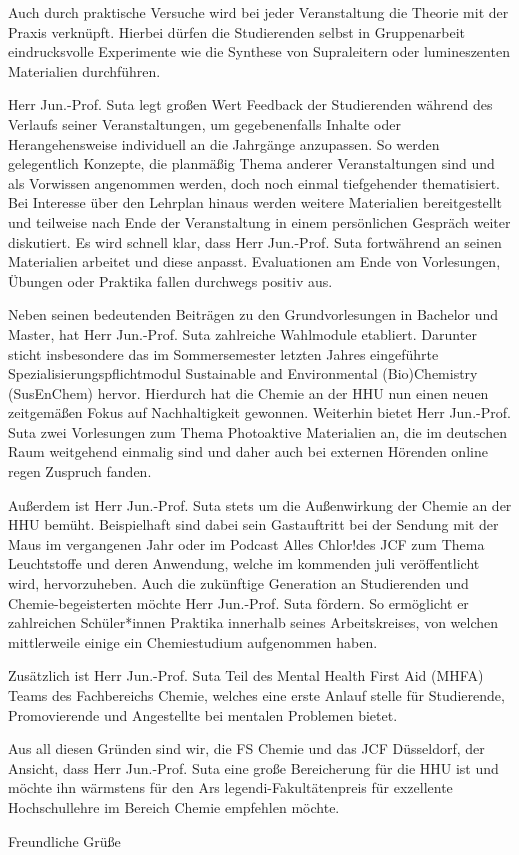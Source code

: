 \documentclass[foldmarks,rightdate,twoside,a4paper]{hhuletter}
\begin{document}
\begin{letter}
Auch durch praktische Versuche wird bei jeder Veranstaltung die Theorie mit der Praxis verknüpft. Hierbei dürfen die Studierenden selbst in Gruppenarbeit eindrucksvolle Experimente wie die Synthese von Supraleitern oder lumineszenten Materialien durchführen.

Herr Jun.-Prof. Suta legt großen Wert Feedback der Studierenden während des Verlaufs seiner Veranstaltungen, um gegebenenfalls Inhalte oder Herangehensweise individuell an die Jahrgänge anzupassen. So werden gelegentlich Konzepte, die planmäßig Thema anderer Veranstaltungen sind und als Vorwissen angenommen werden, doch noch einmal tiefgehender thematisiert. Bei Interesse über den Lehrplan hinaus werden weitere Materialien bereitgestellt und teilweise nach Ende der Veranstaltung in einem persönlichen Gespräch weiter diskutiert. Es wird schnell klar, dass Herr Jun.-Prof. Suta fortwährend an seinen Materialien arbeitet und diese anpasst. Evaluationen am Ende von Vorlesungen, Übungen oder Praktika fallen durchwegs positiv aus. 

Neben seinen bedeutenden Beiträgen zu den Grundvorlesungen in Bachelor und Master, hat Herr Jun.-Prof. Suta zahlreiche Wahlmodule etabliert. Darunter sticht insbesondere das im Sommersemester letzten Jahres eingeführte Spezialisierungspflichtmodul Sustainable and Environmental (Bio)Chemistry (SusEnChem) hervor. Hierdurch hat die Chemie an der HHU nun einen neuen zeitgemäßen Fokus auf Nachhaltigkeit gewonnen. Weiterhin bietet Herr Jun.-Prof. Suta zwei Vorlesungen zum Thema Photoaktive Materialien an, die im deutschen Raum weitgehend einmalig sind und daher auch bei externen Hörenden online regen Zuspruch fanden.

Außerdem ist Herr Jun.-Prof. Suta stets um die Außenwirkung der Chemie an der HHU bemüht. Beispielhaft sind dabei sein Gastauftritt bei der Sendung mit der Maus im vergangenen Jahr oder im Podcast \glqq Alles Chlor!\grqq des JCF zum Thema Leuchtstoffe und deren Anwendung, welche im kommenden juli veröffentlicht wird, hervorzuheben. Auch die zukünftige Generation an Studierenden und Chemie-begeisterten möchte Herr Jun.-Prof. Suta fördern. So ermöglicht er zahlreichen Schüler*innen Praktika innerhalb seines Arbeitskreises, von welchen mittlerweile einige ein Chemiestudium aufgenommen haben. 

Zusätzlich ist Herr Jun.-Prof. Suta Teil des Mental Health First Aid (MHFA) Teams des Fachbereichs Chemie, welches eine erste Anlauf stelle für Studierende, Promovierende und Angestellte bei mentalen Problemen bietet.

Aus all diesen Gründen sind wir, die FS Chemie und das JCF Düsseldorf, der Ansicht, dass Herr Jun.-Prof. Suta eine große Bereicherung für die HHU ist und möchte ihn wärmstens für den Ars legendi-Fakultätenpreis für exzellente Hochschullehre im Bereich Chemie empfehlen möchte. 

\closing{Freundliche Grüße}

\end{letter}
\end{document}
